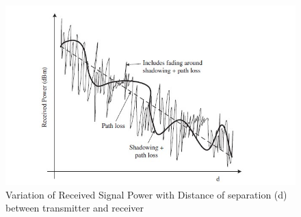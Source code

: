 \begin{figure}[!htbp]
\centering
\includegraphics[scale=1]{Chapter 2/Figures/Path Loss}
\caption[Signal Degradation due to Path Loss and Fading]{Variation of Received Signal Power with Distance of separation (d) between transmitter and receiver}
\label{fig:path loss}
\end{figure}

